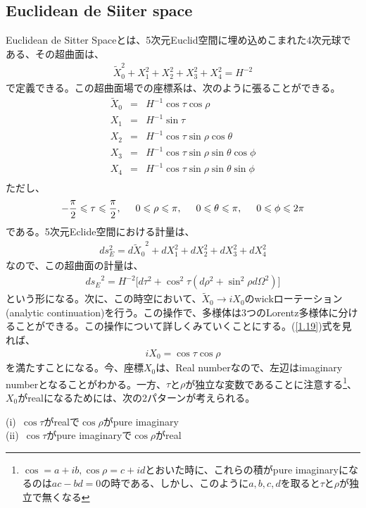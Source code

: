 \subsection{Euclidean de Siiter space}
Euclidean de Sitter Spaceとは、5次元Euclid空間に埋め込めこまれた4次元球である、その超曲面は、
\begin{eqnarray}
  \tilde{X}_0^2+X_1^2+X_2^2+X_3^2+X_4^2=H^{-2}
\end{eqnarray}
で定義できる。この超曲面場での座標系は、次のように張ることができる。
\begin{eqnarray}
  \label{1.19}
  \tilde{X}_0&=&H^{-1}\cos{\tau}\cos{\rho} \\
  \label{test}
  X_1&=&H^{-1}\sin{\tau} \\
  X_2&=&H^{-1}\cos{\tau}\sin{\rho}\cos{\theta} \\
  X_3&=&H^{-1}\cos{\tau}\sin{\rho}\sin{\theta}\cos{\phi} \\
  X_4&=&H^{-1}\cos{\tau}\sin{\rho}\sin{\theta}\sin{\phi} \\
\end{eqnarray}
ただし、
\begin{eqnarray}
  \label{1.25}
  -\frac{\pi}{2} \leqslant \tau \leqslant \frac{\pi}{2},\hspace{0.5cm} 0 \leqslant \rho \leqslant \pi,\hspace{0.5cm} 0 \leqslant \theta \leqslant \pi, \hspace{0.5cm} 0 \leqslant \phi \leqslant 2\pi
\end{eqnarray}
である。5次元Eclide空間における計量は、
\begin{eqnarray}
  ds_{E}^2=d{\tilde{X}_0}^2+dX_1^2+dX_2^2+dX_3^2+dX_4^2
\end{eqnarray}
 なので、この超曲面の計量は、
 \begin{eqnarray}
   \label{4sphereM}
   {ds_{E}}^2=H^{-2}\biggl[d\tau^2 + \cos^2\tau(d\rho^2+\sin^2\rho d\Omega^2)\biggr]
 \end{eqnarray}
 という形になる。次に、この時空において、$\tilde{X}_0\rightarrow iX_{0}$のwickローテーション(analytic continuation)を行う。この操作で、多様体は3つのLorentz多様体に分けることができる。この操作について詳しくみていくことにする。(\ref{1.19})式を見れば、
 \begin{eqnarray}
   iX_0=\cos\tau\cos\rho
 \end{eqnarray}
を満たすことになる。今、座標$X_0$は、Real numberなので、左辺はimaginary numberとなることがわかる。一方、$\tau$と$\rho$が独立な変数であることに注意する\footnote{$\cos=a+ib,\cos\rho=c+id$とおいた時に、これらの積がpure imaginaryになるのは$ac-bd=0$の時である、しかし、このように$a,b,c,d$を取ると$\tau$と$\rho$が独立で無くなる}、$X_0$がrealになるためには、次の2パターンが考えられる。
\begin{center}
  (i)\ $\cos\tau$がrealで$\cos\rho$がpure imaginary \\
  (ii)\ $\cos\tau$がpure imaginaryで$\cos\rho$がreal
\end{center}

